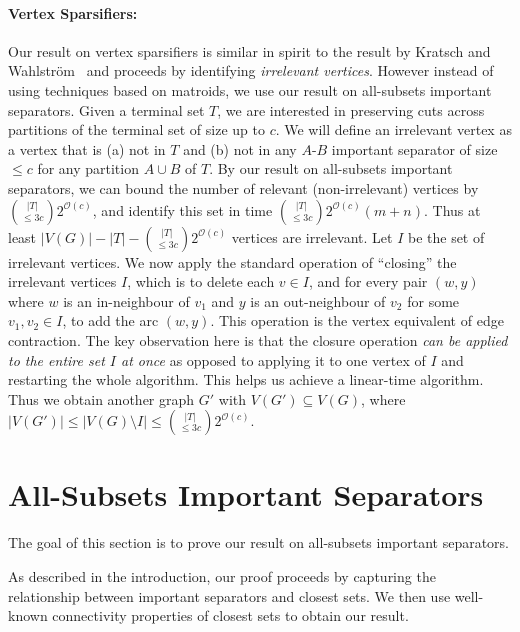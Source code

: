 \documentclass[11pt]{article}
\newcommand{\OO}{\mathcal{O}}
\newcommand{\Wahlstrom}{Wahlstr\"{o}m\xspace}
\begin{document}
\paragraph{Vertex Sparsifiers:} Our result on vertex sparsifiers is similar in spirit to the result by Kratsch and \Wahlstrom~\cite{kratsch2012representative} and proceeds by identifying \emph{irrelevant vertices}. However instead of using techniques based on matroids, we use our result on all-subsets important separators. Given a terminal set $T$, we are interested in preserving cuts across partitions of the terminal set of size up to $c$. We will define an irrelevant vertex as a vertex that is (a) not in $T$ and (b) not in any $A$-$B$ important separator of size $\leq c$ for any partition $A \cup B$ of $T$. By our result on all-subsets important separators, we can bound the number of relevant (non-irrelevant) vertices by ${|T| \choose  \leq 3c} 2^{\OO(c)}$, and identify this set in time ${|T| \choose \leq 3c} 2^{\OO(c)} (m + n)$. Thus at least $|V(G)| - |T| -  {|T| \choose \leq 3c} 2^{\OO(c)}$ vertices are irrelevant. Let $I$ be the set of irrelevant vertices. We now apply the standard operation of ``closing'' the irrelevant vertices $I$, which is to delete each $v \in I$, and for every pair $(w,y)$ where $w$ is an in-neighbour of $v_1$ and $y$ is an out-neighbour of $v_2$ for some $v_1,v_2 \in I$, to add the arc $(w,y)$. This operation is the vertex equivalent of edge contraction. The key observation here is that the closure operation \emph{can be applied to the entire set $I$ at once} as opposed to applying it to one vertex of $I$ and restarting the whole algorithm. This helps us achieve a linear-time algorithm. Thus we obtain another graph $G'$ with $V(G') \subseteq V(G)$, where $|V(G')| \leq |V(G) \setminus I| \leq  {|T| \choose \leq 3c} 2^{\OO(c)}$.









 



\section{All-Subsets Important Separators}
The goal of this section is to prove our result on all-subsets important separators.
\impsep*

As described in the introduction, our proof proceeds by capturing the relationship between important separators and closest sets. We then use well-known connectivity properties of closest sets to obtain our result.
\end{document}
